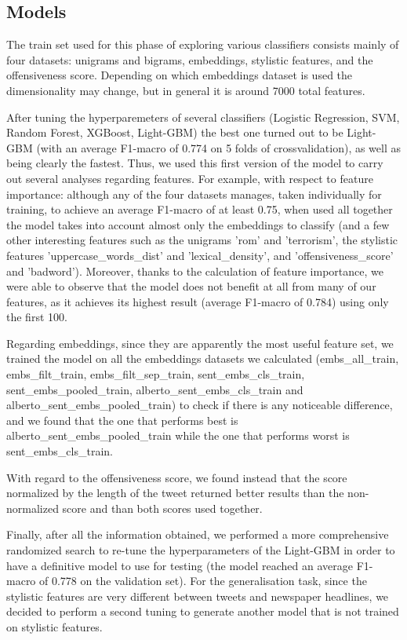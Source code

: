 \subsection{Models}

The train set used for this phase of exploring various classifiers consists mainly of four datasets: unigrams and bigrams, embeddings, stylistic features, and the offensiveness score. Depending on which embeddings dataset is used the dimensionality may change, but in general it is around 7000 total features.

After tuning the hyperparemeters of several classifiers (Logistic Regression, SVM, Random Forest, XGBoost, Light-GBM) the best one turned out to be Light-GBM (with an average F1-macro of 0.774 on 5 folds of crossvalidation), as well as being clearly the fastest. Thus, we used this first version of the model to carry out several analyses regarding features.
For example, with respect to feature importance: although any of the four datasets manages, taken individually for training, to achieve an average F1-macro of at least 0.75, when used all together the model takes into account almost only the embeddings to classify (and a few other interesting features such as the unigrams 'rom' and 'terrorism', the stylistic features 'uppercase\_words\_dist' and 'lexical\_density', and 'offensiveness\_score' and 'badword').
Moreover, thanks to the calculation of feature importance, we were able to observe that the model does not benefit at all from many of our features, as it achieves its highest result (average F1-macro of 0.784) using only the first 100. 


Regarding embeddings, since they are apparently the most useful feature set, we trained the model on all the embeddings datasets we calculated (embs\_all\_train, embs\_filt\_train, embs\_filt\_sep\_train, sent\_embs\_cls\_train, sent\_embs\_pooled\_train, alberto\_sent\_embs\_cls\_train and alberto\_sent\_embs\_pooled\_train) to check if there is any noticeable difference, and we found that the one that performs best is alberto\_sent\_embs\_pooled\_train while the one that performs worst is sent\_embs\_cls\_train.

With regard to the offensiveness score, we found instead that the score normalized by the length of the tweet returned better results than the non-normalized score and than both scores used together.

Finally, after all the information obtained, we performed a more comprehensive randomized search to re-tune the hyperparameters of the Light-GBM in order to have a definitive model to use for testing (the model reached an average F1-macro of 0.778 on the validation set). For the generalisation task, since the stylistic features are very different between tweets and newspaper headlines, we decided to perform a second tuning to generate another model that is not trained on stylistic features.